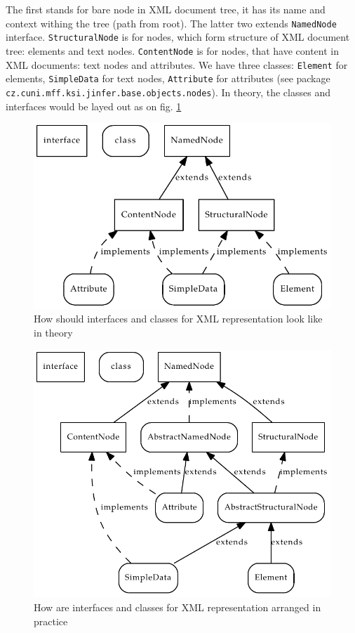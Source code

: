 \documentclass[a4paper,10pt,oneside]{article}
\newcommand{\myscale}{0.74}
\newcommand{\code}[1]{\texttt{#1}}
\begin{document}
The first stands for bare node in XML document tree, it has its name and context withing the tree (path from root).
The latter two extends \code{NamedNode} interface.
\code{StructuralNode} is for nodes, which form structure of XML document tree: elements and text nodes.
\code{ContentNode} is for nodes, that have content in XML documents: text nodes and attributes.
We have three classes: \code{Element} for elements, \code{SimpleData} for text nodes, \code{Attribute} for attributes (see package \code{cz.cuni.mff.ksi.jinfer.base.objects.nodes}).
In theory, the classes and interfaces would be layed out as on fig. \ref{interfaces_nodes}
\begin{figure}
\centering\includegraphics[scale=\myscale]{interfaces_nodes}
\caption{How should interfaces and classes for XML representation look like in theory} \label{interfaces_nodes}
\end{figure}
\begin{figure}
\centering\includegraphics[scale=\myscale]{nodes}
\caption{How are interfaces and classes for XML representation arranged in practice} \label{nodes}
\end{figure}
\end{document}
